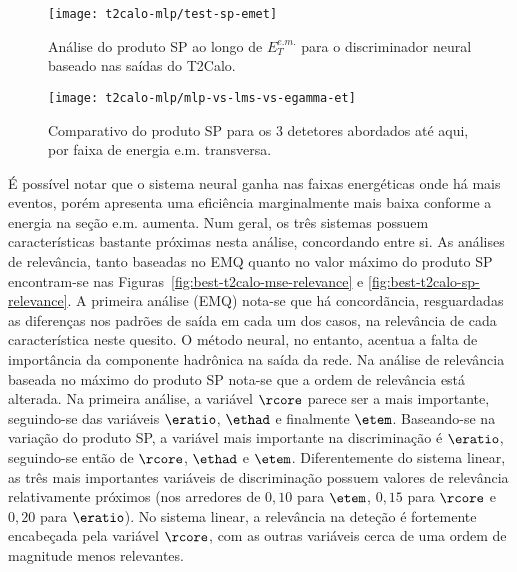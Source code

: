 \begin{figure}
\begin{center}
\texttt{[image: t2calo-mlp/test-sp-emet]}
\end{center}
\caption{Análise do produto SP ao longo de $E^{e.m.}_T$ para o discriminador
neural baseado nas saídas do T2Calo.}
\label{fig:best-t2calo-test-sp-emet}
\end{figure}

\begin{figure}
\begin{center}
\texttt{[image: t2calo-mlp/mlp-vs-lms-vs-egamma-et]}
\end{center}
\caption{Comparativo do produto SP para os 3 detetores abordados até aqui, por
faixa de energia e.m. transversa.}
\label{fig:best-t2calo-versus-others-emet}
\end{figure}

É possível notar que o sistema neural ganha nas faixas energéticas onde há
mais eventos, porém apresenta uma eficiência marginalmente mais baixa conforme
a energia na seção e.m. aumenta. Num geral, os três sistemas possuem
características bastante próximas nesta análise, concordando entre si. As
análises de relevância, tanto baseadas no EMQ quanto no valor máximo do
produto SP encontram-se nas Figuras~\ref{fig:best-t2calo-mse-relevance} e
\ref{fig:best-t2calo-sp-relevance}. A primeira análise (EMQ) nota-se que há
concordãncia, resguardadas as diferenças nos padrões de saída em cada um dos
casos, na relevância de cada característica neste quesito. O método neural, no
entanto, acentua a falta de importância da componente hadrônica na saída da
rede. Na análise de relevância baseada no máximo do produto SP nota-se que a
ordem de relevância está alterada. Na primeira análise, a variável $\rcore$
parece ser a mais importante, seguindo-se das variáveis $\eratio$, $\ethad$ e
finalmente $\etem$. Baseando-se na variação do produto SP, a variável mais
importante na discriminação é $\eratio$, seguindo-se então de $\rcore$,
$\ethad$ e $\etem$. Diferentemente do sistema linear, as três mais importantes
variáveis de discriminação possuem valores de relevância relativamente
próximos (nos arredores de $0,10$ para $\etem$, $0,15$ para $\rcore$ e $0,20$
para $\eratio$). No sistema linear, a relevância na deteção é fortemente
encabeçada pela variável $\rcore$, com as outras variáveis cerca de uma ordem
de magnitude menos relevantes. 

